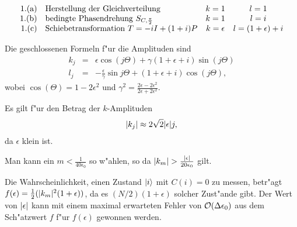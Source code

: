 
\begin{slide}\sf
{}
  $$ 
  \begin{array}{rlcc}
    \mbox{1.(a)} & \mbox{Herstellung der Gleichverteilung }            & k=1         & l=1 \cr
    \mbox{1.(b)} & \mbox{bedingte Phasendrehung } S_{C,\frac{\pi}{2}}  & k=1         & l=i \cr
    \mbox{1.(c)} & \mbox{Schiebetransformation } T=-iI+(1+i)P          & k=\epsilon  & l=(1+\epsilon)+i
  \end{array}
  $$

\end{slide}


\begin{slide}\sf
{}

Die geschlossenen Formeln f"ur die Amplituden sind
\begin{eqnarray*}
  k_j & = & \epsilon\cos(j\Theta) + \gamma(1+\epsilon+i)\sin(j\Theta) \\
  l_j & = & -\frac{\epsilon}{\gamma}\sin{j\Theta}+(1+\epsilon+i)\cos(j\Theta),
\end{eqnarray*}
wobei $\cos(\Theta) = 1 - 2\epsilon^2$ und $\gamma^2 = \frac{2\epsilon-2\epsilon^2}{2\epsilon+2\epsilon^2}$.

Es gilt f"ur den Betrag der $k$-Amplituden
$$ \vert k_j \vert \approx 2\sqrt{2}\vert \epsilon \vert j, $$
da $\epsilon$ klein ist.

\end{slide}


\begin{slide}\sf
{}

Man kann ein $m < \frac{1}{40\epsilon_0}$ so w"ahlen, so da\3 
$\vert k_m \vert > \frac{\vert \epsilon \vert}{20\epsilon_0}$ gilt.
\vfill
{}

Die Wahrscheinlichkeit, einen Zustand $\left|i\right>$ mit $C(i)=0$ 
zu messen, betr"agt $f(\epsilon)=\frac{1}{2}(\vert k_m  \vert^2(1+\epsilon))$, 
da es $(N/2)(1+\epsilon)$ solcher Zust"ande gibt. 
\vfill
Der Wert von $\vert \epsilon \vert$ kann mit einem maximal erwarteten Fehler 
von ${\cal O}(\Delta\epsilon_0)$ aus dem Sch"atzwert $f$ f"ur 
$f(\epsilon)$ gewonnen werden.
\vfill
\end{slide}

